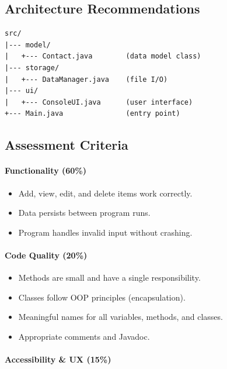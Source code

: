 \documentclass[
  justified,
  openright,
]{tufte-book}
\let\subsubsection\paragraph
\let\paragraph\paragraph
\let\subsubsection\paragraph
\let\paragraph\paragraph
\providecommand{\tightlist}{%
  \setlength{\itemsep}{0pt}\setlength{\parskip}{0pt}}
\begin{document}
\subsection{Architecture
Recommendations}\label{architecture-recommendations}

\begin{verbatim}
src/
|--- model/
|   +--- Contact.java        (data model class)
|--- storage/
|   +--- DataManager.java    (file I/O)
|--- ui/
|   +--- ConsoleUI.java      (user interface)
+--- Main.java               (entry point)
\end{verbatim}

\subsection{Assessment Criteria}\label{assessment-criteria}

\subsubsection{Functionality (60\%)}\label{functionality-60}

\begin{itemize}
\tightlist
\item[$\square$]
  Add, view, edit, and delete items work correctly.
\item[$\square$]
  Data persists between program runs.
\item[$\square$]
  Program handles invalid input without crashing.
\end{itemize}

\subsubsection{Code Quality (20\%)}\label{code-quality-20}

\begin{itemize}
\tightlist
\item[$\square$]
  Methods are small and have a single responsibility.
\item[$\square$]
  Classes follow OOP principles (encapsulation).
\item[$\square$]
  Meaningful names for all variables, methods, and classes.
\item[$\square$]
  Appropriate comments and Javadoc.
\end{itemize}

\subsubsection{Accessibility \& UX (15\%)}\label{accessibility-ux-15}
\end{document}
